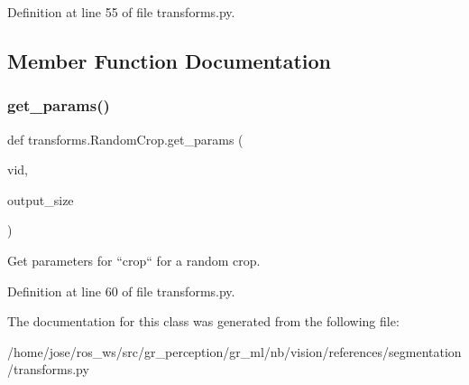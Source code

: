 Definition at line 55 of file transforms.\+py.



\subsection{Member Function Documentation}
\mbox{\label{classtransforms_1_1RandomCrop_ac45dd69d66ab4cf5531d82bc7512b7ce}} 
\subsubsection{\texorpdfstring{get\+\_\+params()}{get\_params()}}
{\footnotesize\ttfamily def transforms.\+Random\+Crop.\+get\+\_\+params (\begin{DoxyParamCaption}\item[{}]{vid,  }\item[{}]{output\+\_\+size }\end{DoxyParamCaption})\hspace{0.3cm}{\ttfamily [static]}}

\begin{DoxyVerb}Get parameters for ``crop`` for a random crop.
\end{DoxyVerb}
 

Definition at line 60 of file transforms.\+py.



The documentation for this class was generated from the following file\+:\begin{DoxyCompactItemize}
\item 
/home/jose/ros\+\_\+ws/src/gr\+\_\+perception/gr\+\_\+ml/nb/vision/references/segmentation/transforms.\+py\end{DoxyCompactItemize}
